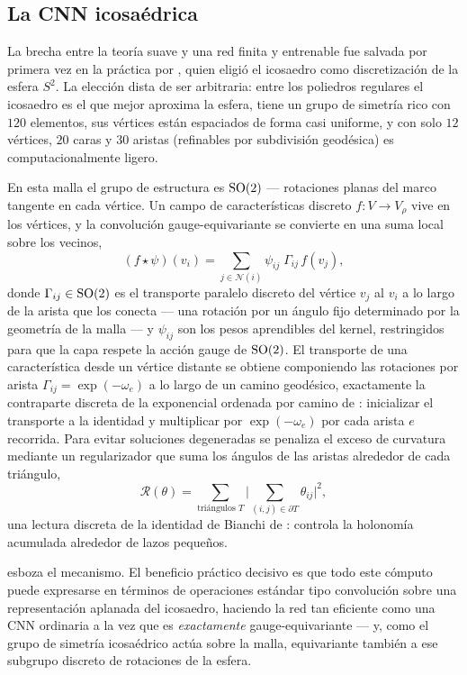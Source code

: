 \subsection{La CNN icosa\'edrica}
\label{sec:gauge:icosahedral}

La brecha entre la teor\'ia suave y una red finita y entrenable fue salvada por
primera vez en la pr\'actica por \citet{cohen2019gaugeequivariantconvolutional},
quien eligi\'o el icosaedro como discretizaci\'on de la esfera $S^2$. La
elecci\'on dista de ser arbitraria: entre los poliedros regulares el icosaedro es
el que mejor aproxima la esfera, tiene un grupo de simetr\'ia rico con $120$
elementos, sus v\'ertices est\'an espaciados de forma casi uniforme, y con solo
$12$ v\'ertices, $20$ caras y $30$ aristas (refinables por subdivisi\'on
geod\'esica) es computacionalmente ligero.

En esta malla el grupo de estructura es $\operatorname{SO}(2)$ --- rotaciones planas del marco
tangente en cada v\'ertice. Un campo de caracter\'isticas discreto $f\colon V \to
V_\rho$ vive en los v\'ertices, y la convoluci\'on gauge-equivariante se convierte
en una suma local sobre los vecinos,
\[
  (f \star \psi)(v_i) = \sum_{j \in \mathcal{N}(i)}
    \psi_{ij}\; \Gamma_{ij}\, f(v_j),
\]
donde $\Gamma_{ij} \in \operatorname{SO}(2)$ es el transporte paralelo discreto del v\'ertice
$v_j$ al $v_i$ a lo largo de la arista que los conecta --- una rotaci\'on por un
\'angulo fijo determinado por la geometr\'ia de la malla --- y $\psi_{ij}$ son los
pesos aprendibles del kernel, restringidos para que la capa respete la acci\'on
gauge de $\operatorname{SO}(2)$. El transporte de una caracter\'istica desde un v\'ertice
distante se obtiene componiendo las rotaciones por arista $\Gamma_{ij} =
\exp(-\omega_e)$ a lo largo de un camino geod\'esico, exactamente la contraparte
discreta de la exponencial ordenada por camino de :
inicializar el transporte a la identidad y multiplicar por $\exp(-\omega_e)$ por
cada arista $e$ recorrida. Para evitar soluciones degeneradas se penaliza el
exceso de curvatura mediante un regularizador que suma los \'angulos de las
aristas alrededor de cada tri\'angulo,
\[
  \mathcal{R}(\theta) = \sum_{\text{tri\'angulos } T}
    \Big|\sum_{(i,j) \in \partial T} \theta_{ij}\Big|^2,
\]
una lectura discreta de la identidad de Bianchi de :
controla la holonom\'ia acumulada alrededor de lazos peque\~nos.

 esboza el mecanismo. El beneficio pr\'actico
decisivo es que todo este c\'omputo puede expresarse en t\'erminos de operaciones
est\'andar tipo convoluci\'on sobre una representaci\'on aplanada del icosaedro,
haciendo la red tan eficiente como una CNN ordinaria a la vez que es
\emph{exactamente} gauge-equivariante --- y, como el grupo de simetr\'ia
icosa\'edrico act\'ua sobre la malla, equivariante tambi\'en a ese subgrupo
discreto de rotaciones de la esfera.


